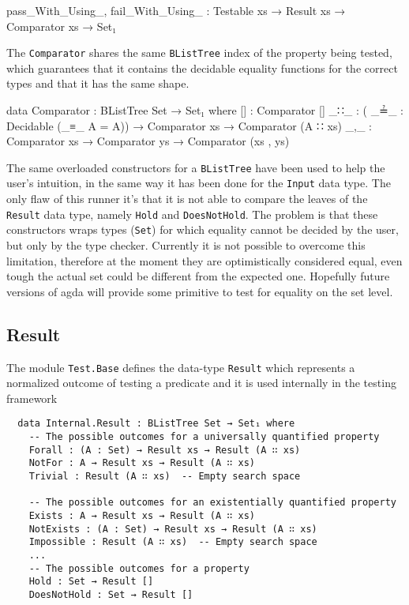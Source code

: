 \documentclass[10pt,a4paper]{article}
\begin{document}
\begin{code}
pass_With_Using_, fail_With_Using_ : Testable xs → Result xs → 
                                     Comparator xs → Set₁
\end{code}
The \texttt{Comparator} shares the same \texttt{BListTree} index  of the property  being tested, which guarantees that it contains the decidable equality functions for the correct types and that it has the same shape.
\begin{code}
data Comparator : BListTree Set → Set₁ where
  [] : Comparator []
  _∷_ : ( _≟_ : Decidable (_≡_ {A = A}))  → Comparator xs → Comparator (A ∷ xs)
  _,_ : Comparator xs → Comparator ys → Comparator (xs , ys)
\end{code}
The same overloaded constructors for a \texttt{BListTree} have been used to help the user's intuition, in the same way it has been done for the \texttt{Input} data type.
The only flaw of this runner it's that it is not able to compare the leaves of the \texttt{Result} data type, namely \texttt{Hold} and \texttt{DoesNotHold}. The problem is that these constructors wraps types (\texttt{Set}) for which equality cannot be decided by the user, but only by the type checker. Currently it is not possible to overcome this limitation, therefore at the moment they are optimistically considered equal, even tough the actual set could be different from the expected one. Hopefully future versions of agda will provide some primitive to test for equality on the set level.

\subsection{Result}
\label{sec:Result}
The module \texttt{Test.Base} defines the data-type \texttt{Result} which represents a normalized outcome of testing a predicate and it is used internally in the testing framework

\begin{verbatim}
  data Internal.Result : BListTree Set → Set₁ where
    -- The possible outcomes for a universally quantified property
    Forall : (A : Set) → Result xs → Result (A ∷ xs)
    NotFor : A → Result xs → Result (A ∷ xs)
    Trivial : Result (A ∷ xs)  -- Empty search space

    -- The possible outcomes for an existentially quantified property
    Exists : A → Result xs → Result (A ∷ xs)
    NotExists : (A : Set) → Result xs → Result (A ∷ xs)
    Impossible : Result (A ∷ xs)  -- Empty search space
    ...	
    -- The possible outcomes for a property
    Hold : Set → Result []
    DoesNotHold : Set → Result []
\end{verbatim}
\end{document}
